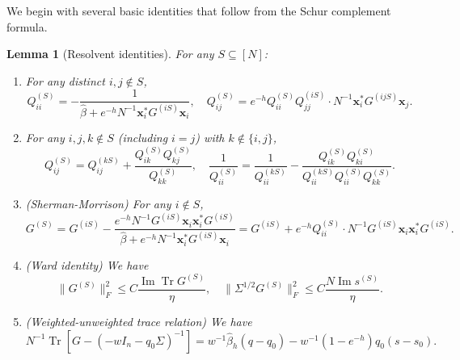 \documentclass[11pt,reqno]{amsart}
\def\x{\mathbf{x}}
\def\Im{\operatorname{Im}}
\def\Tr{\operatorname{Tr}}
\newtheorem{lemma}[theorem]{Lemma}
\theoremstyle{definition}
\numberwithin{equation}{section}
\numberwithin{figure}{section}
\begin{document}
We begin with several basic identities that follow from the Schur complement formula.
\begin{lemma}[Resolvent identities]\label{lem:resolvent identities}
For any $S\subseteq[N]$:
\begin{enumerate}[label=(\alph*)]
    \item For any distinct $i,j\notin S$,
    \[
        Q_{ii}^{(S)}=-\frac{1}{\hat\beta+e^{-h}N^{-1}\x_i^*G^{(iS)}\x_i},\quad Q_{ij}^{(S)}=e^{-h}Q_{ii}^{(S)}Q_{jj}^{(iS)}\cdot N^{-1}\x_i^*G^{(ijS)}\x_j.
    \]
    \item For any $i,j,k\notin S$ (including $i=j$) with $k\notin\{i,j\}$,
    \[
        Q_{ij}^{(S)}=Q_{ij}^{(kS)}+\frac{Q_{ik}^{(S)}Q_{kj}^{(S)}}{Q_{kk}^{(S)}},\quad \frac{1}{Q_{ii}^{(S)}}=\frac{1}{Q_{ii}^{(kS)}}-\frac{Q_{ik}^{(S)}Q_{ki}^{(S)}}{Q_{ii}^{(kS)}Q_{ii}^{(S)}Q_{kk}^{(S)}}.
    \]
    \item (Sherman-Morrison) For any $i\notin S$,
    \[
        G^{(S)}=G^{(iS)}-\frac{e^{-h}N^{-1}G^{(iS)}\x_i\x_i^*G^{(iS)}}{\hat\beta+e^{-h}N^{-1}\x_i^*G^{(iS)}\x_i}=G^{(iS)}+e^{-h}Q_{ii}^{(S)}\cdot N^{-1}G^{(iS)}\x_i\x_i^*G^{(iS)}.
    \]
    \item (Ward identity) We have
    \[
        \|G^{(S)}\|_F^2\leq C\frac{\Im\Tr G^{(S)}}{\eta},\quad \|\Sigma^{1/2}G^{(S)}\|_F^2\leq C\frac{N\Im s^{(S)}}{\eta}.
    \]
    \item (Weighted-unweighted trace relation) We have
    \[
        N^{-1}\Tr[G-(-wI_n-q_0\Sigma)^{-1}]=w^{-1}\hat\beta_h(q-q_0)-w^{-1}(1-e^{-h})q_0(s-s_0).
    \]
\end{enumerate}
\end{lemma}
\end{document}
